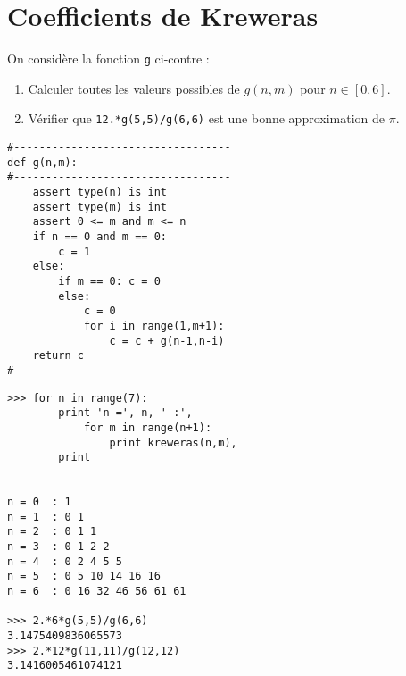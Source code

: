 \documentclass[12pt]{article}
\begin{document}
\section{Coefficients de Kreweras}
\begin{minipage}[t]{7cm}
On consid\`ere la fonction {\tt g} ci-contre :
\begin{enumerate}
\item Calculer toutes les valeurs possibles
	de $g(n,m)$ pour $n \in [0,6]$.
\item Vérifier que {\tt 12.*g(5,5)/g(6,6)} est une bonne approximation de
	$\pi$.
\end{enumerate}
\end{minipage}
\hfill
\begin{minipage}[t]{7cm}\footnotesize
\begin{verbatim}
#----------------------------------
def g(n,m):
#----------------------------------
    assert type(n) is int
    assert type(m) is int
    assert 0 <= m and m <= n
    if n == 0 and m == 0:
        c = 1
    else:
        if m == 0: c = 0
        else:
            c = 0
            for i in range(1,m+1):
                c = c + g(n-1,n-i)
    return c
#---------------------------------
\end{verbatim}
\end{minipage}

\noindent\begin{minipage}[t]{8cm}
\begin{verbatim}
>>> for n in range(7):
        print 'n =', n, ' :',
            for m in range(n+1):
                print kreweras(n,m),
        print

	
n = 0  : 1
n = 1  : 0 1
n = 2  : 0 1 1
n = 3  : 0 1 2 2
n = 4  : 0 2 4 5 5
n = 5  : 0 5 10 14 16 16
n = 6  : 0 16 32 46 56 61 61

>>> 2.*6*g(5,5)/g(6,6)
3.1475409836065573
>>> 2.*12*g(11,11)/g(12,12)
3.1416005461074121

\end{verbatim}
\end{minipage}

\end{document}
